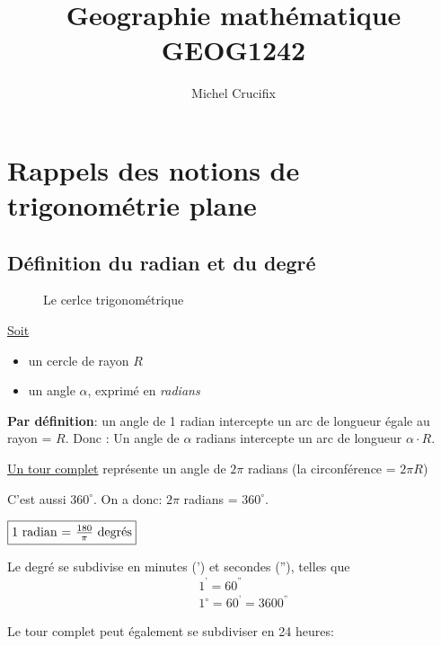 \documentclass[12pt]{report}
\title{Geographie mathématique GEOG1242 }
\author{Michel Crucifix}
\begin{document}
 
\maketitle
\tableofcontents
 \par\noindent
\chapter{ Rappels des notions de trigonométrie plane}
 
 \par\noindent
\section{Définition du radian et du degré}

\begin{figure}[h]
\begin{center}
\end{center}
\caption{Le cerlce trigonométrique}
\label{fig:1}
\end{figure}



\underline{Soit}

\begin{itemize}
\item un cercle de rayon $R$
\item un angle $\alpha$, exprimé en {\it radians}
\end{itemize}


\textbf{Par définition}: un angle de 1 radian intercepte un arc de longueur égale au rayon = $R$.  Donc : Un angle de $\alpha$ radians intercepte un arc de longueur $\alpha \cdot R$.  

\underline{Un tour complet} représente un angle de $2\pi$ radians (la circonférence = $2\pi R$)

C'est aussi $360^\circ$. On a donc: $2\pi$ radians = $360^\circ$.

\begin{center}
$\fbox{1 radian = ${180 \over \pi}$ degrés}$
\end{center}

Le degré se subdivise en minutes (') et secondes (''), telles que 
\begin{eqnarray*}
&& 1^{\mbox{'}} = 60^{\mbox{''}}\\
& & 1^\circ = 60^{\mbox{'}} = 3600^{\mbox{''}}
\end{eqnarray*}

Le tour complet peut également se subdiviser en 24 heures:
\end{document}

